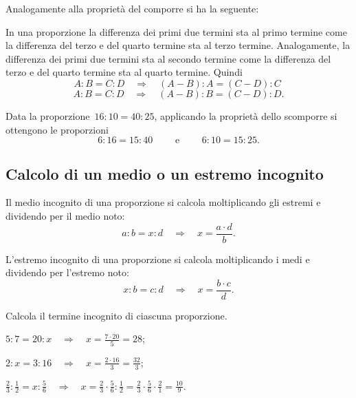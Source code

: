 Analogamente alla proprietà del comporre si ha la seguente:

\begin{proprieta}
  In una proporzione la differenza dei primi due termini sta al primo termine come la differenza del
 terzo e del quarto termine sta al terzo termine. Analogamente, la differenza dei primi due termini
sta al secondo termine come la differenza del terzo e del quarto termine sta al quarto termine. Quindi
\[A:B=C:D\quad\Rightarrow\quad (A-B):A=(C-D):C\phantom{.}\]
\[A:B=C:D\quad\Rightarrow\quad (A-B):B=(C-D):D.\]
\end{proprieta}

\begin{exrig}
 \begin{esempio}
Data la proporzione~$16:10=40:25$, applicando la proprietà dello scomporre si ottengono le proporzioni
\[6:16=15:40\qquad\text{ e }\qquad6:10=15:25.\]
 \end{esempio}
\end{exrig}

\subsection{Calcolo di un medio o un estremo incognito}
Il medio incognito di una proporzione si calcola moltiplicando gli estremi e dividendo per il medio noto:
\[a:b=x:d\quad\Rightarrow\quad x=\frac{a\cdot d}{b}.\]

L'estremo incognito di una proporzione si calcola moltiplicando i medi e dividendo per l'estremo noto:
\[x:b=c:d\quad\Rightarrow\quad x=\frac{b\cdot c}{d}.\]

\begin{exrig} %
\begin{esempio}
Calcola il termine incognito di ciascuna proporzione.
\vspace{-1.3ex}\begin{itemize*}
  \item $5:7=20:x\quad\Rightarrow\quad x=\frac{7\cdot 20}{5}=28$;
  \item $2:x=3:16\quad\Rightarrow\quad x=\frac{2\cdot 16}{3}=\frac{32}{3}$;
  \item $\frac{2}{3}:\frac{1}{2}=x:\frac{5}{6}%
\quad\Rightarrow\quad x=\frac{2}{3}\cdot\frac{5}{6}:\frac{1}{2}=\frac{2}{3}%
\cdot\frac{5}{6}\cdot\frac{2}{1}=\frac{10}{9}$.
\end{itemize*}
\end{esempio}%
\end{exrig}

